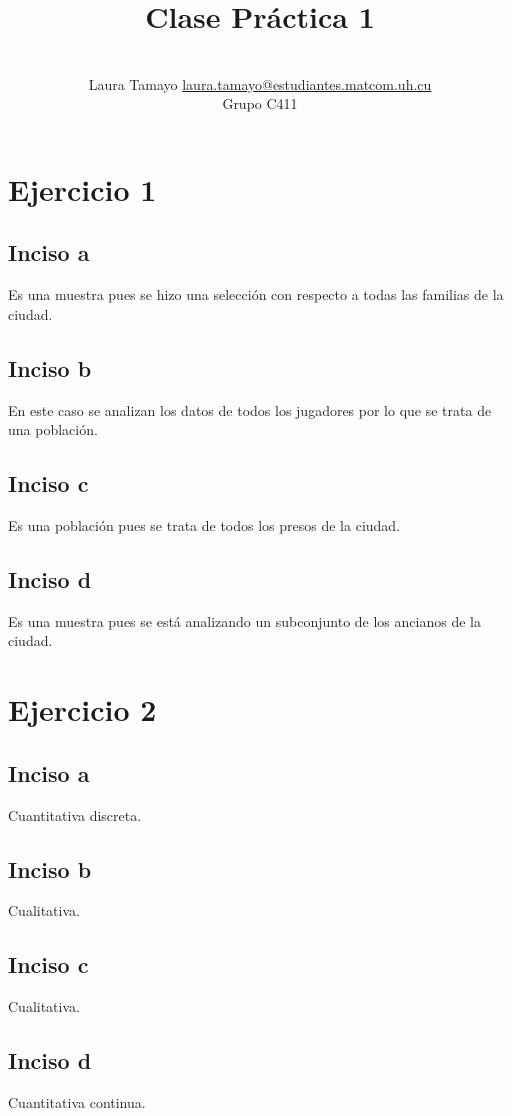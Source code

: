 \documentclass[a4paper,12pt]{article}
\title{Clase Práctica 1 }
\author{\\
\name Laura Tamayo \email \href{mailto:laura.tamayo@estudiantes.matcom.uh.cu}{laura.tamayo@estudiantes.matcom.uh.cu}
	\\ \addr Grupo C411}
\begin{document}
\maketitle
{} %

\thispagestyle{empty}

\section*{Ejercicio 1}

\subsection*{Inciso a}
Es una muestra pues se hizo una selección con respecto a todas las familias de la ciudad.
\subsection*{Inciso b}
En este caso se analizan los datos de todos los jugadores por lo que se trata de una población.
\subsection*{Inciso c}
Es una población pues se trata de todos los presos de la ciudad.
\subsection*{Inciso d}
Es una muestra pues se está analizando un subconjunto de los ancianos de la ciudad.

\section*{Ejercicio 2}
\subsection*{Inciso a}
Cuantitativa discreta.
\subsection*{Inciso b}
Cualitativa.
\subsection*{Inciso c}
Cualitativa.
\subsection*{Inciso d}
Cuantitativa continua.
\end{document}
